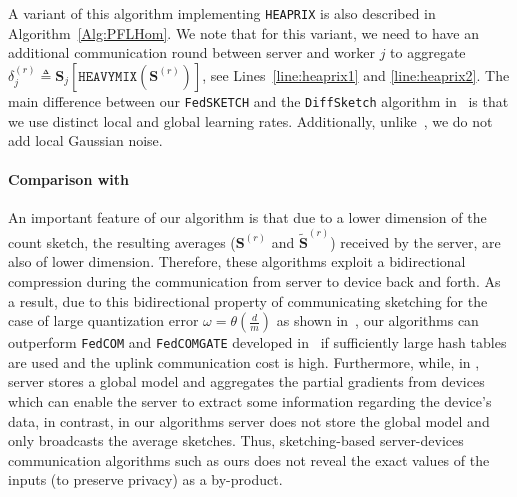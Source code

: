 \documentclass[twoside]{article}
\begin{document}
A variant of this algorithm implementing \texttt{HEAPRIX} is also described in Algorithm~\ref{Alg:PFLHom}. 
We note that for this variant, we need to have an additional communication round between server and worker $j$ to aggregate $\delta_j^{(r)}\triangleq \mathbf{S}_j\left[\texttt{HEAVYMIX}(\mathbf{S}^{(r)})\right]$, see Lines~\ref{line:heaprix1} and \ref{line:heaprix2}. The main difference between our \texttt{FedSKETCH} and the \texttt{DiffSketch} algorithm in~\cite{li2019privacy} is that we use distinct local and global learning rates. Additionally, unlike~\cite{li2019privacy}, we do not add local Gaussian noise. 
\paragraph{Comparison  with~\cite{haddadpour2020federated}}\label{rmrk:bidirect}
An important feature of our algorithm is that due to a lower dimension of the count sketch, the resulting averages ($\mathbf{S}^{(r)}$ and  $\tilde{\mathbf{S}}^{(r)}$) received by the server, are also of lower dimension. 
Therefore, these algorithms exploit a bidirectional compression during the communication from server to device back and forth. 
As a result, due to this bidirectional property of communicating sketching for the case of large quantization error $\omega=\theta(\frac{d}{m})$ as shown in~\cite{haddadpour2020federated}, our algorithms can outperform \texttt{FedCOM} and \texttt{FedCOMGATE} developed in~\cite{haddadpour2020federated} if sufficiently large hash tables are used and the uplink communication cost is high. 
Furthermore, while, in \cite{haddadpour2020federated}, server stores a global model and aggregates the partial gradients from devices which can enable the server to extract some information regarding the device's data, in contrast, in our algorithms server does not store the global model and only broadcasts the average sketches. 
Thus, sketching-based server-devices communication algorithms such as ours does not reveal the exact values of the inputs (to preserve privacy) as a by-product.
\vspace{-0.05in}
\end{document}
